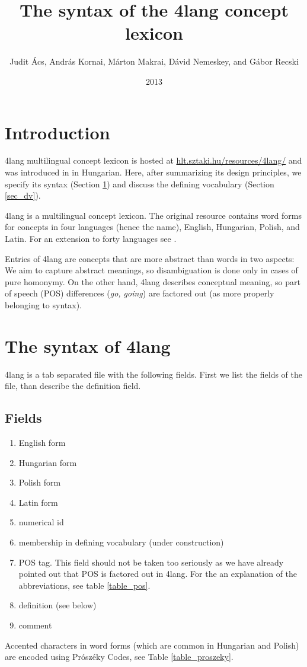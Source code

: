 \documentclass[a4paper,10pt]{article}
\title{The syntax of the 4lang concept lexicon}
\author{Judit Ács, András Kornai, Márton Makrai, Dávid Nemeskey, and Gábor Recski}
\date{2013}
\begin{document}
\maketitle
\section*{Introduction}
4lang multilingual concept lexicon is hosted at
\url{hlt.sztaki.hu/resources/4lang/} and was introduced in \cite{Kornai:2013}
in Hungarian. Here, after summarizing its design principles, we specify
its syntax (Section \ref{sec_synt}) and discuss the defining vocabulary
(Section \ref{sec_dv}).

4lang is a multilingual concept lexicon. The original resource contains word
forms for concepts in four languages (hence the name), English, Hungarian,
Polish, and Latin. For an extension to forty languages see \cite{Acs:2013}.

Entries of 4lang are concepts that are more abstract than words in two
aspects: We aim to capture abstract meanings, so disambiguation is done only
in cases of pure homonymy. On the other hand, 4lang describes conceptual
meaning, so part of speech (POS) differences (\emph{go, going}) are factored
out (as more properly belonging to syntax).
\section{The syntax of 4lang}\label{sec_synt}
4lang is a tab separated file with the following fields. First we list the
fields of the file, than describe the definition field.
\subsection{Fields}
\begin{enumerate}
 \item English form
\item Hungarian form
\item Polish form
\item Latin form
\item numerical id
\item membership in defining vocabulary (under construction)
\item POS tag. This field should not be taken too seriously as we have already pointed out that POS is factored out in 4lang. For the an explanation of the abbreviations, see table \ref{table_pos}.
\item definition (see below)
\item comment
\end{enumerate}
Accented characters in word forms (which are common in Hungarian and Polish)
are encoded using Prószéky Codes, see Table \ref{table_proszeky}.
\end{document}
